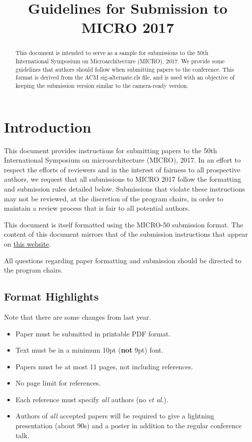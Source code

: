 \documentclass{sig-alternate}
\title{Guidelines for Submission to MICRO 2017}
\begin{document}
\maketitle
\thispagestyle{firstpage}
\pagestyle{plain}




\begin{abstract}

  This document is intended to serve as a sample for submissions to
  the 50th International Symposium on Microarchitecture (MICRO), 2017.
  We provide some guidelines that authors should follow when
  submitting papers to the conference.  This format is derived from
  the ACM sig-alternate.cls file, and is used with an objective of
  keeping the submission version similar to the camera-ready version. 

\end{abstract}

\section{Introduction}

This document provides instructions for submitting papers to the 50th
International Symposium on microarchitecture (MICRO), 2017.  In an
effort to respect the efforts of reviewers and in the interest of
fairness to all prospective authors, we request that all submissions
to MICRO 2017 follow the formatting and submission rules detailed
below. Submissions that violate these instructions may not be reviewed,
at the discretion of the program chairs, in order to maintain a review
process that is fair to all potential authors.


This document is itself formatted using the MICRO-50 submission format.
The content of this document mirrors that of the submission
instructions that appear on
\href{http://www.microarch.org/micro50/Submission/}{this website}.

All questions regarding paper formatting and submission should be directed
to the program chairs.

\subsection{Format Highlights}
 Note that there are some changes from last year. 
\begin{itemize} 
\item Paper must be submitted in printable PDF format.
\item Text must be in a minimum 10pt ({\bf not} 9pt) font.
\item Papers must be at most 11 pages, not including references. 
\item No page limit for references. 
\item Each reference must specify {\em all} authors (no {\em et al.}). 
\item Authors of {\em all} accepted papers will be required to give a
lightning presentation (about 90s) and a poster in addition to the regular
conference talk.
\end{itemize} 
\end{document}
